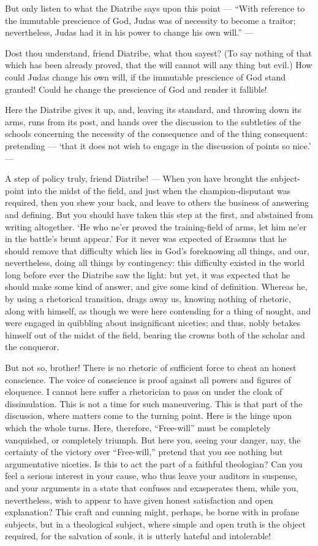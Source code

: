 But only listen to what the Diatribe says upon this point — “With reference to the immutable prescience of God, Judas was of necessity to become a traitor; nevertheless, Judas had it in his power to change his own will.” —

Dost thou understand, friend Diatribe, what thou sayest? (To say nothing of that which has been already proved, that the will cannot will any thing but evil.) How could Judas change his own will, if the immutable prescience of God stand granted! Could he change the prescience of God and render it fallible!

Here the Diatribe gives it up, and, leaving its standard, and throwing down its arms, runs from its post, and hands over the discussion to the subtleties of the schools concerning the necessity of the consequence and of the thing consequent: pretending — ‘that it does not wish to engage in the discussion of points so nice.’ —

A step of policy truly, friend Diatribe! — When you have brought the subject-point into the midst of the field, and just when the champion-disputant was required, then you shew your back, and leave to others the business of answering and defining. But you should have taken this step at the first, and abstained from writing altogether. ‘He who ne’er proved the training-field of arms, let him ne’er in the battle’s brunt appear.’ For it never was expected of Erasmus that he should remove that difficulty which lies in God’s foreknowing all things, and our, nevertheless, doing all things by contingency: this difficulty existed in the world long before ever the Diatribe saw the light: but yet, it was expected that he should make some kind of answer, and give some kind of definition. Whereas he, by using a rhetorical transition, drags away us, knowing nothing of rhetoric, along with himself, as though we were here contending for a thing of nought, and were engaged in quibbling about insignificant niceties; and thus, nobly betakes himself out of the midst of the field, bearing the crowns both of the scholar and the conqueror.

But not so, brother! There is no rhetoric of sufficient force to cheat an honest conscience. The voice of conscience is proof against all powers and figures of eloquence. I cannot here suffer a rhetorician to pass on under the cloak of dissimulation. This is not a time for such maneuvering. This is that part of the discussion, where matters come to the turning point. Here is the hinge upon which the whole turns. Here, therefore, “Free-will” must be completely vanquished, or completely triumph. But here you, seeing your danger, nay, the certainty of the victory over “Free-will,” pretend that you see nothing but argumentative niceties. Is this to act the part of a faithful theologian? Can you feel a serious interest in your cause, who thus leave your auditors in suspense, and your arguments in a state that confuses and exasperates them, while you, nevertheless, wish to appear to have given honest satisfaction and open explanation? This craft and cunning might, perhaps, be borne with in profane subjects, but in a theological subject, where simple and open truth is the object required, for the salvation of souls, it is utterly hateful and intolerable!

